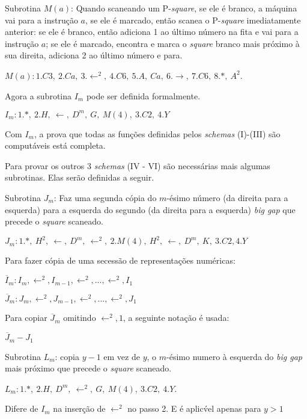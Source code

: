 \documentclass[10pt,letterpaper]{article}
\begin{document}
Subrotina $M(a)$: Quando scaneando um P-\textit{square}, se ele \'e branco, a m\'aquina vai para a instru\c{c}\~{a}o $a$, se ele \'e marcado, ent\~{a}o scanea o P-\textit{square} imediatamente anterior: se ele \'e branco, ent\~{a}o adiciona 1 ao \'ultimo n\'umero na fita e vai para a instru\c{c}\~{a}o $a$; se ele \'e marcado, encontra e marca o \textit{square} branco mais pr\'oximo \`a sua direita, adiciona 2 ao \'ultimo n\'umero e para.
\begin{center}
$M(a): 1.C3,\ 2.Ca,\ 3.\leftarrow^2,\ 4.C6,\ 5.A,\ Ca,\ 6.\rightarrow,\ 7.C6,\ 8.*,\ A^2$.
\end{center}

Agora a subrotina $I_m$ pode ser definida formalmente.
\begin{center}
$I_m: 1.*,\ 2.H,\ \leftarrow,\ D^m,\ G,\ M(4),\ 3.C2,\ 4.Y$
\end{center}

Com $I_m$, a prova que todas as fun\c{c}\~{o}es definidas pelos \textit{schemas} (I)-(III) s\~{a}o comput\'aveis est\'a completa.

Para provar os outros 3 \textit{schemas} (IV - VI) s\~{a}o necess\'arias mais algumas subrotinas. Elas ser\~{a}o definidas a seguir.

Subrotina $J_m$: Faz uma segunda c\'opia do $m$-\'esimo n\'umero (da direita para a esquerda) para a esquerda do segundo (da direita para a esquerda) \textit{big gap} que precede o \textit{square} scaneado.
\begin{center}
$J_m: 1.*,\ H^2,\ \leftarrow,\ D^m,\ \leftarrow^2,\ 2.M(4),\ H^2,\ \leftarrow,\ D^m,\ K,\ 3.C2, 4.Y$
\end{center}

Para fazer c\'opia de uma secess\~{a}o de representa\c{c}\~{o}es num\'ericas:
\begin{center}
$\overline{I}_m: I_m, \leftarrow^2, I_{m-1}, \leftarrow^2, ..., \leftarrow^2, I_1$
\end{center}
\begin{center}
$\overline{J}_m: J_m, \leftarrow^2, J_{m-1}, \leftarrow^2, ..., \leftarrow^2, J_1$
\end{center}

Para copiar $\overline{J}_m$ omitindo $\leftarrow^2, 1$, a seguinte nota\c{c}\~{a}o \'e usada:
\begin{center}
$\overline{J}_m - J_1$
\end{center}

Subrotina $L_m$: copia $y-1$ em vez de $y$, o $m$-\'esimo numero \`a esquerda do \textit{big gap} mais pr\'oximo que precede o \textit{square} scaneado.
\begin{center}
$L_m: 1.*,\ 2.H,\ D^m,\ \leftarrow^2,\ G,\ M(4),\ 3.C2,\ 4.Y$.
\end{center}
Difere de $I_m$ na inser\c{c}\~{a}o de $\leftarrow^2$ no passo 2. E \'e aplic\'vel apenas para $y > 1$
\end{document}
